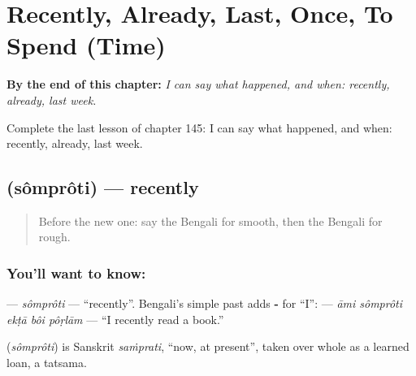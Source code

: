 
\chapter{Recently, Already, Last, Once, To Spend (Time)}
\label{ch:bn-recently-already-last-once-to-spend-time}

\begin{chapteropening}
\textbf{By the end of this chapter:} \emph{I can say what happened, and when: recently, already, last week.}

Complete the last lesson of chapter 145: I can say what happened, and when: recently, already, last week.
\end{chapteropening}

\section[\texorpdfstring{\bn{সম্প্রতি} (sômprôti)}{সম্প্রতি (sômprôti)}]{ (sômprôti) — recently}

\label{lesson:BN-C145-somproti}



\begin{quote}
Before the new one: say the Bengali for smooth, then the Bengali for rough.
\end{quote}

\subsection*{You'll want to know: }
\textbf{} — \emph{sômprôti} — \textquotedblleft{}recently\textquotedblright{}. Bengali's simple past adds \textbf{-} for \textquotedblleft{}I\textquotedblright{}: \textbf{    } — \emph{āmi sômprôti ekṭā bôi pôṛlām} — \textquotedblleft{}I recently read a book.\textquotedblright{}

\begin{cousinweb}
\textbf{} (\emph{sômprôti}) is Sanskrit \emph{saṁprati}, \textquotedblleft{}now, at present\textquotedblright{}, taken over whole as a learned loan, a tatsama.
\end{cousinweb}

